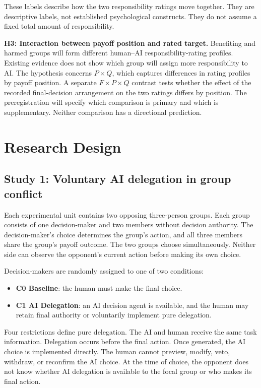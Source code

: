 \documentclass[11pt,a4paper]{article}
\newcommand{\Baseline}{\textbf{C0 Baseline}}
\newcommand{\AID}{\textbf{C1 AI Delegation}}
\begin{document}
These labels describe how the two responsibility ratings move together. They are descriptive labels, not established psychological constructs. They do not assume a fixed total amount of responsibility.

\textbf{H3: Interaction between payoff position and rated target.} Benefiting and harmed groups will form different human--AI responsibility-rating profiles. Existing evidence does not show which group will assign more responsibility to AI. The hypothesis concerns $P\times Q$, which captures differences in rating profiles by payoff position. A separate $F\times P\times Q$ contrast tests whether the effect of the recorded final-decision arrangement on the two ratings differs by position. The preregistration will specify which comparison is primary and which is supplementary. Neither comparison has a directional prediction.

\section{Research Design}

\subsection{Study 1: Voluntary AI delegation in group conflict}

Each experimental unit contains two opposing three-person groups. Each group consists of one decision-maker and two members without decision authority. The decision-maker's choice determines the group's action, and all three members share the group's payoff outcome. The two groups choose simultaneously. Neither side can observe the opponent's current action before making its own choice.

Decision-makers are randomly assigned to one of two conditions:

\begin{itemize}
\item \Baseline{}: the human must make the final choice.
\item \AID{}: an AI decision agent is available, and the human may retain final authority or voluntarily implement pure delegation.
\end{itemize}

Four restrictions define pure delegation. The AI and human receive the same task information. Delegation occurs before the final action. Once generated, the AI choice is implemented directly. The human cannot preview, modify, veto, withdraw, or reconfirm the AI choice. At the time of choice, the opponent does not know whether AI delegation is available to the focal group or who makes its final action.
\end{document}
